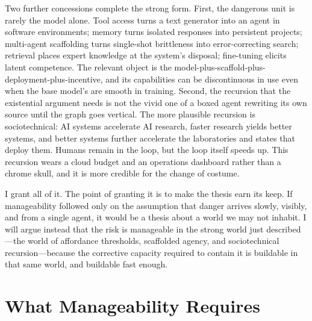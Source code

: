 \documentclass[11pt]{article}
\begin{document}
Two further concessions complete the strong form. First, the dangerous unit is rarely the model alone. Tool access turns a text generator into an agent in software environments; memory turns isolated responses into persistent projects; multi-agent scaffolding turns single-shot brittleness into error-correcting search; retrieval places expert knowledge at the system's disposal; fine-tuning elicits latent competence. The relevant object is the model-plus-scaffold-plus-deployment-plus-incentive, and its capabilities can be discontinuous in use even when the base model's are smooth in training. Second, the recursion that the existential argument needs is not the vivid one of a boxed agent rewriting its own source until the graph goes vertical. The more plausible recursion is sociotechnical: AI systems accelerate AI research, faster research yields better systems, and better systems further accelerate the laboratories and states that deploy them. Humans remain in the loop, but the loop itself speeds up. This recursion wears a cloud budget and an operations dashboard rather than a chrome skull, and it is more credible for the change of costume.

I grant all of it. The point of granting it is to make the thesis earn its keep. If manageability followed only on the assumption that danger arrives slowly, visibly, and from a single agent, it would be a thesis about a world we may not inhabit. I will argue instead that the risk is manageable in the strong world just described---the world of affordance thresholds, scaffolded agency, and sociotechnical recursion---because the corrective capacity required to contain it is buildable in that same world, and buildable fast enough.

\section{What Manageability Requires}
\label{sec:requires}
\end{document}
